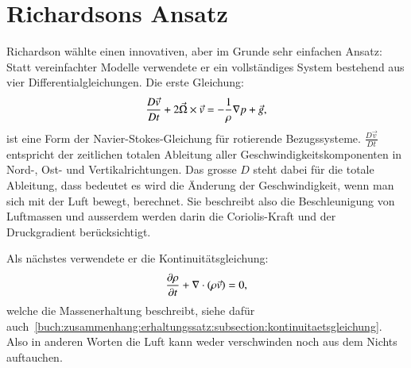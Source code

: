%
%
%
%
\section{Richardsons Ansatz \label{geostrophisch:section:richardsonAnsatz}}

Richardson wählte einen innovativen, aber im Grunde sehr einfachen Ansatz:  
Statt vereinfachter Modelle verwendete er ein vollständiges System bestehend aus vier Differentialgleichungen.
Die erste Gleichung:
\begin{equation}
	\frac{D\vec{v}}{Dt} + 2\vec{\Omega} \times \vec{v} = -\frac{1}{\rho}\nabla p + \vec{g} \\,
	\label{eq:navstok}
\end{equation}
ist eine Form der Navier-Stokes-Gleichung für rotierende Bezugssysteme.
%
%
$\frac{D\vec{v}}{Dt}$ entspricht der zeitlichen totalen Ableitung aller Geschwindigkeitskomponenten in Nord-, Ost- und Vertikalrichtungen.
Das grosse $D$ steht dabei für die totale Ableitung, dass bedeutet es wird die Änderung der Geschwindigkeit, wenn man sich mit der Luft bewegt, berechnet. 
Sie beschreibt also die Beschleunigung von Luftmassen und ausserdem werden darin die Coriolis-Kraft und der Druckgradient berücksichtigt.

Als nächstes verwendete er die Kontinuitätsgleichung:
%
\begin{equation}
	\frac{\partial \rho}{\partial t} + \nabla \cdot (\rho \vec{v}) = 0 \\,
	\label{eq:kont}
\end{equation}
welche die Massenerhaltung beschreibt, siehe dafür auch~\ref{buch:zusammenhang:erhaltungssatz:subsection:kontinuitaetsgleichung}.
%
Also in anderen Worten die Luft kann weder verschwinden noch aus dem Nichts auftauchen. 

